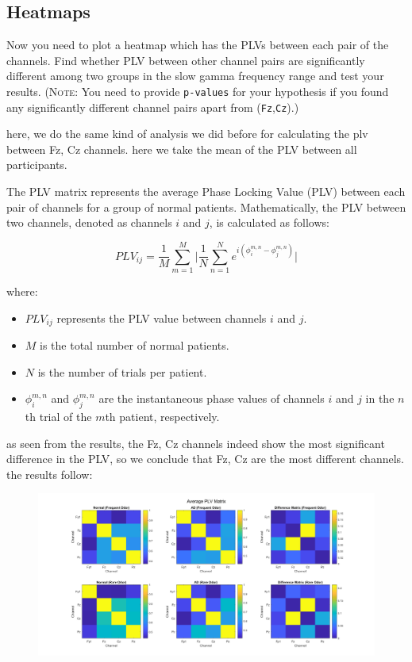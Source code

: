 \documentclass[12pt]{article}
\begin{document}
\subsection{Heatmaps} Now you need to plot a heatmap which has the PLVs between each pair of the channels. Find whether PLV between other channel pairs are significantly different among two groups in the slow gamma frequency range and test your results. (\textsc{Note:} You need to provide \texttt{p-values} for your hypothesis if you found any significantly different channel pairs apart from (\texttt{Fz},\texttt{Cz}).)

\begin{qsolve}[]
	here, we do the same kind of analysis we did before for calculating the plv between Fz, Cz channels.
	here we take the mean of the PLV between all participants.

	The PLV matrix represents the average Phase Locking Value (PLV) between each pair of channels for a group of normal patients. Mathematically, the PLV between two channels, denoted as channels $i$ and $j$, is calculated as follows:

	\[
		PLV_{ij} = \frac{1}{M} \sum_{m=1}^{M} \Big|\frac{1}{N} \sum_{n=1}^{N} e^{i(\phi_i^{m,n} - \phi_j^{m,n})}\Big|
	\]

	where:
	\begin{itemize}
		\item $PLV_{ij}$ represents the PLV value between channels $i$ and $j$.
		\item $M$ is the total number of normal patients.
		\item $N$ is the number of trials per patient.
		\item $\phi_i^{m,n}$ and $\phi_j^{m,n}$ are the instantaneous phase values of channels $i$ and $j$ in the $n$th trial of the $m$th patient, respectively.
	\end{itemize}

	as seen from the results, the Fz, Cz channels indeed show the most significant difference in the PLV, so we conclude that Fz, Cz are the most different channels.
	the results follow:
\end{qsolve}

\begin{figure}[h]
	\centering
	\includegraphics*[width=\linewidth]{../computation/PLV/result/heatmap.png}
\end{figure}
\newpage
\end{document}
